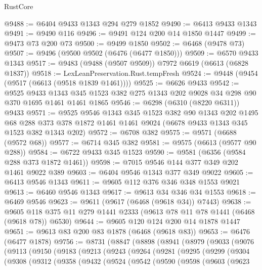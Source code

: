 \begin{lexlean}{RustCore}
\begin{coremodule}
@9488 := @6404 @9433 @1343 @294 @279 @1852
@9490 := @6413 @9433 @1343
@9491 := @9490 @116
@9496 := @9491 @124 @200 @14 @1850 @1447
@9499 := @9473 @73 @200 @73
@9500 := @9499 @1850
@9502 := @6468 (@9478 @73)
@9507 := @9496 (@9500 @9502 (@6476 (@6477 @1850)))
@9509 := @6570 @9433 @1343
@9517 := @9483 (@9488 (@9507 @9509)) @7972 @6619 (@6613 (@6828 @1837))
@9518 := LexLeanPreservation.Rust.tempFresh
@9524 := @9448 (@9454 (@9517 (@6613 (@9518 @1839 @1461))))
@9525 := @6626 @9433
@9542 := @9525
    @9433
    @1343
    @345
    @1523
    @382
    @275
    @1343
    @202
    @9028
    @34
    @298
    @90
    @370
    @1695
    @1461
    @1461
    @1865
@9546 := @6298 (@6310 (@8220 @6311)) @9433
@9571 := @9525
    @9546
    @1343
    @345
    @1523
    @382
    @90
    @1343
    @202
    @1495
    @68
    @288
    @373
    @378
    @1872
    @1461
    @1461
    @9024
    (@6678 @9433 @1343 @345 @1523 @382 @1343 @202)
@9572 := @6708 @382
@9575 := @9571 (@6688 (@9572 @68))
@9577 := @6714 @345 @382
@9581 := @9575 (@6613 (@9577 @90 @288))
@9584 := @6722 @9433 @345 @1523
@9590 := @9581 (@6356 (@9584 @288 @373 @1872 @1461))
@9598 := @7015 @9546 @144 @377 @349 @202 @1461 @9022 @389
@9603 := @6404 @9546 @1343 @377 @349 @9022
@9605 := @6413 @9546 @1343
@9611 := @9605 @112 @376 @346 @348 @1553 @9021
@9613 := @6460 @9546 @1343
@9617 := @9613 @34 @346 @34 @1553
@9618 := @6469 @9546
@9623 := @9611 (@9617 (@6468 (@9618 @34)) @7443)
@9638 := @9605 @118 @375 @11 @279 @1441 @2333 (@9613 @78 @11 @78 @1441 (@6468 (@9618 @78)) @6530)
@9644 := @9605 @120 @124 @200 @14 @1878 @1447
@9651 := @9613 @83 @200 @83 @1878 (@6468 (@9618 @83))
@9653 := @6476 (@6477 @1878)
@9756 := @8731
    (@8847
      (@8898
        (@8941
          (@8979
            (@9033
              (@9076
                (@9113
                  (@9150
                    (@9183
                      (@9213
                        (@9243
                          (@9264
                            (@9281
                              (@9295
                                (@9299
                                  (@9304
                                    (@9308
                                      (@9312
                                        (@9358
                                          (@9432
                                            (@9524
                                              (@9542
                                                (@9590
                                                  (@9598
                                                    (@9603
                                                      (@9623

\end{coremodule}
\end{lexlean}
